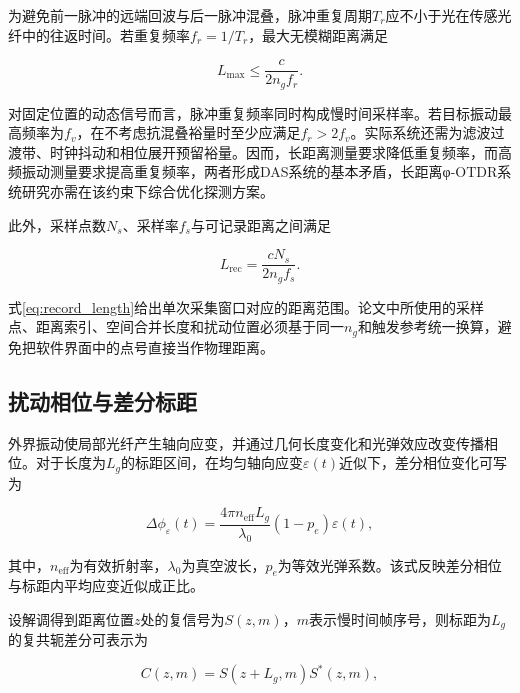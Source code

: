 为避免前一脉冲的远端回波与后一脉冲混叠，脉冲重复周期$T_r$应不小于光在传感光纤中的往返时间。若重复频率$f_r=1/T_r$，最大无模糊距离满足

\begin{equation}
L_{\max}\leq\frac{c}{2n_g f_r}.
\label{eq:max_range}
\end{equation}

对固定位置的动态信号而言，脉冲重复频率同时构成慢时间采样率。若目标振动最高频率为$f_v$，在不考虑抗混叠裕量时至少应满足$f_r>2f_v$。实际系统还需为滤波过渡带、时钟抖动和相位展开预留裕量。因而，长距离测量要求降低重复频率，而高频振动测量要求提高重复频率，两者形成DAS系统的基本矛盾，长距离φ-OTDR系统研究亦需在该约束下综合优化探测方案\cite{masoudi2016review,muanenda2018advances,rao2021recent,sha2018longhaul_thesis}。

此外，采样点数$N_s$、采样率$f_s$与可记录距离之间满足

\begin{equation}
L_{\mathrm{rec}}=\frac{cN_s}{2n_g f_s}.
\label{eq:record_length}
\end{equation}

式\eqref{eq:record_length}给出单次采集窗口对应的距离范围。论文中所使用的采样点、距离索引、空间合并长度和扰动位置必须基于同一$n_g$和触发参考统一换算，避免把软件界面中的点号直接当作物理距离。

\subsection{扰动相位与差分标距}

外界振动使局部光纤产生轴向应变，并通过几何长度变化和光弹效应改变传播相位。对于长度为$L_g$的标距区间，在均匀轴向应变$\varepsilon(t)$近似下，差分相位变化可写为

\begin{equation}
\Delta\phi_\varepsilon(t)
=
\frac{4\pi n_{\mathrm{eff}}L_g}{\lambda_0}
\left(1-p_e\right)
\varepsilon(t),
\label{eq:strain_phase}
\end{equation}

其中，$n_{\mathrm{eff}}$为有效折射率，$\lambda_0$为真空波长，$p_e$为等效光弹系数。该式反映差分相位与标距内平均应变近似成正比\cite{posey2000strain,liokumovich2015fundamentals,bhatta2019dynamic}。

设解调得到距离位置$z$处的复信号为$S(z,m)$，$m$表示慢时间帧序号，则标距为$L_g$的复共轭差分可表示为

\begin{equation}
C(z,m)
=
S(z+L_g,m)S^*(z,m),
\label{eq:complex_difference}
\end{equation}

